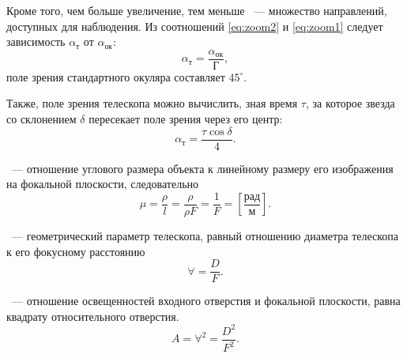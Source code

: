 Кроме того, чем больше увеличение, тем меньше ~--- множество направлений, доступных для наблюдения. Из соотношений \eqref{eq:zoom2} и \eqref{eq:zoom1} следует зависимость  $\alpha_\text{т}$ от  $\alpha_\text{ок}$:
\begin{equation}
    \alpha_\text{т} = \frac{\alpha_\text{ок}}{\text{Г}},
\end{equation}
поле зрения стандартного окуляра составляет $45^\circ$.

Также, поле зрения телескопа можно вычислить, зная время $\tau$, за которое звезда со склонением $\delta$ пересекает поле зрения через его центр:
\begin{equation}
    \alpha_\text{т} = \frac{\tau \cos\delta}{4}.
\end{equation}

~--- отношение углового размера объекта к линейному размеру его изображения на фокальной плоскости, следовательно
\begin{equation}
    \mu = \frac{\rho}{l} = \frac{\rho}{\rho F} = \frac{1}{F}=\left[\frac{\text{рад}}{\text{м}}\right].
\end{equation}

~--- геометрический параметр телескопа, равный отношению диаметра телескопа к его фокусному расстоянию
\begin{equation}
    \forall=\frac{D}{F}.
\end{equation}

~--- отношение освещенностей входного отверстия и фокальной плоскости, равна квадрату относительного отверстия.
\begin{equation}
    A=\forall^2=\frac{D^2}{F^2}.
\end{equation}

